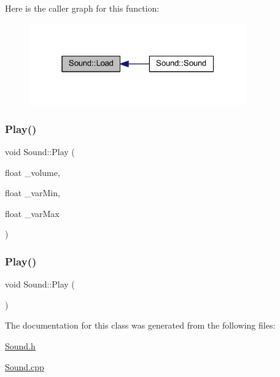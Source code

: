 Here is the caller graph for this function\+:
\nopagebreak
\begin{figure}[H]
\begin{center}
\leavevmode
\includegraphics[width=265pt]{class_sound_aa42f9f9625be20a1a84eeda8fac24cbb_icgraph}
\end{center}
\end{figure}
\mbox{\label{class_sound_a5ed28df22c2c96a5c40fa1d2444556d0}} 
\subsubsection{\texorpdfstring{Play()}{Play()}\hspace{0.1cm}{\footnotesize\ttfamily [1/2]}}
{\footnotesize\ttfamily void Sound\+::\+Play (\begin{DoxyParamCaption}\item[{float}]{\+\_\+volume,  }\item[{float}]{\+\_\+var\+Min,  }\item[{float}]{\+\_\+var\+Max }\end{DoxyParamCaption})}

\mbox{\label{class_sound_a8106f65989f5cd4490c6cfe7032cf2b1}} 
\subsubsection{\texorpdfstring{Play()}{Play()}\hspace{0.1cm}{\footnotesize\ttfamily [2/2]}}
{\footnotesize\ttfamily void Sound\+::\+Play (\begin{DoxyParamCaption}{ }\end{DoxyParamCaption})}



The documentation for this class was generated from the following files\+:\begin{DoxyCompactItemize}
\item 
\mbox{\hyperlink{_sound_8h}{Sound.\+h}}\item 
\mbox{\hyperlink{_sound_8cpp}{Sound.\+cpp}}\end{DoxyCompactItemize}
